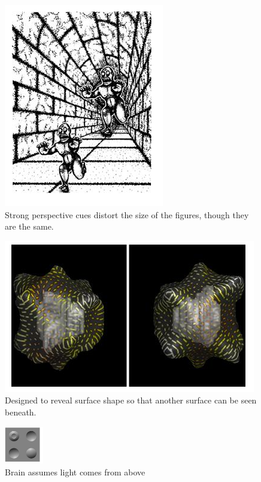 \begin{mdframed}
\begin{multicols}{2}
    \begin{figure}[H]
        \centering
        \includegraphics[width=0.6\linewidth]{perspective_illusion.png}
        \caption{Strong perspective cues distort the size of the figures,
        though they are the same.}
    \end{figure}
    \begin{figure}[H]
        \centering
        \includegraphics[width=\linewidth]{transparent_textures.png}
        \caption{Designed to reveal surface shape so that another surface can
        be seen beneath.}
    \end{figure}
\end{multicols}
\begin{multicols}{3}
    \begin{figure}[H]
        \centering
        \includegraphics[width=0.15\textwidth]{assume_from_above.png}
        \caption{Brain assumes light comes from above}
    \end{figure}


\end{multicols}
\end{mdframed}
